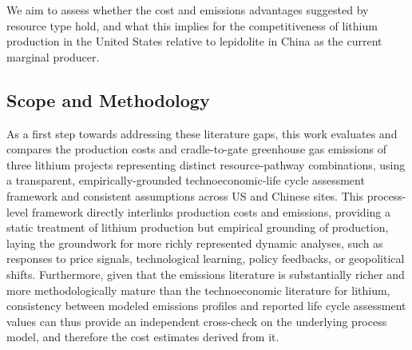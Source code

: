 We aim to assess whether the cost and emissions advantages suggested by resource type hold, and what this implies for the competitiveness of lithium production in the United States relative to lepidolite in China as the current marginal producer.

\subsection{Scope and Methodology}\label{sec:04-scopemethod}

As a first step towards addressing these literature gaps, this work evaluates and compares the production costs and cradle-to-gate greenhouse gas emissions of three lithium projects representing distinct resource-pathway combinations, using a transparent, empirically-grounded technoeconomic-life cycle assessment framework and consistent assumptions across US and Chinese sites. This process-level framework directly interlinks production costs and emissions, providing a static treatment of lithium production but empirical grounding of production, laying the groundwork for more richly represented dynamic analyses, such as responses to price signals, technological learning, policy feedbacks, or geopolitical shifts. Furthermore, given that the emissions literature is substantially richer and more methodologically mature than the technoeconomic literature for lithium, consistency between modeled emissions profiles and reported life cycle assessment values can thus provide an independent cross-check on the underlying process model, and therefore the cost estimates derived from it. 

